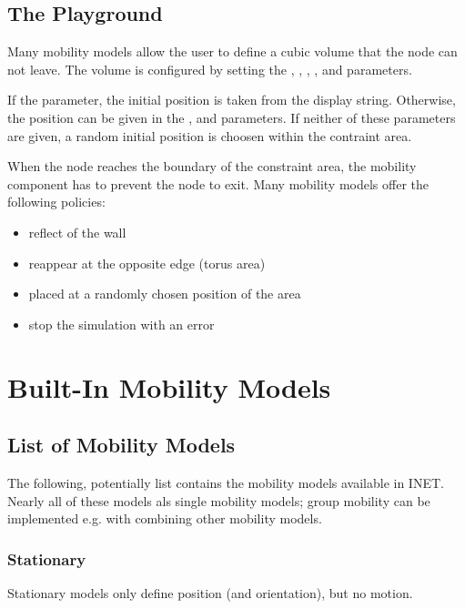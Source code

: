 \subsection*{The Playground}

Many mobility models allow the user to define a cubic volume that the node 
can not leave. The volume is configured by setting the , 
, ,
,  and
 parameters.

If the  parameter, the initial position is taken from
the display string. Otherwise, the position can be given in the ,
 and  parameters. If neither of these parameters
are given, a random initial position is choosen within the contraint area.

When the node reaches the boundary of the constraint area, the mobility
component has to prevent the node to exit. Many mobility models offer the 
following policies:

\begin{itemize}
  \item reflect of the wall
  \item reappear at the opposite edge (torus area)
  \item placed at a randomly chosen position of the area
  \item stop the simulation with an error
\end{itemize}


\section{Built-In Mobility Models}

\subsection{List of Mobility Models}

The following, potentially list contains the mobility models available in INET.
Nearly all of these models als single mobility models; group mobility can be 
implemented e.g. with combining other mobility models.

\subsubsection*{Stationary}

Stationary models only define position (and orientation), but no motion.

